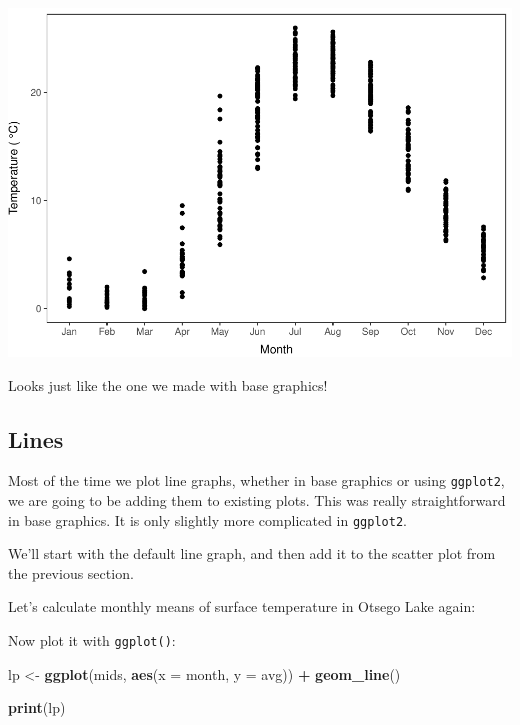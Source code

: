 \documentclass[
]{book}
\newenvironment{Shaded}{\begin{snugshade}}{\end{snugshade}}
\newcommand{\DataTypeTok}[1]{\textcolor[rgb]{0.13,0.29,0.53}{#1}}
\newcommand{\KeywordTok}[1]{\textcolor[rgb]{0.13,0.29,0.53}{\textbf{#1}}}
\newcommand{\NormalTok}[1]{#1}
\newcommand{\OperatorTok}[1]{\textcolor[rgb]{0.81,0.36,0.00}{\textbf{#1}}}
\newcommand{\StringTok}[1]{\textcolor[rgb]{0.31,0.60,0.02}{#1}}
\begin{document}
\includegraphics{worstr_files/figure-latex/unnamed-chunk-107-1.pdf}

Looks just like the one we made with base graphics!

\hypertarget{gglines}{%
\subsection{Lines}\label{gglines}}

Most of the time we plot line graphs, whether in base graphics or using \texttt{ggplot2}, we are going to be adding them to existing plots. This was really straightforward in base graphics. It is only slightly more complicated in \texttt{ggplot2}.

We'll start with the default line graph, and then add it to the scatter plot from the previous section.

Let's calculate monthly means of surface temperature in Otsego Lake again:

\begin{Shaded}
\end{Shaded}

Now plot it with \texttt{ggplot()}:

\begin{Shaded}
\begin{Highlighting}[]
\NormalTok{lp <-}\StringTok{ }\KeywordTok{ggplot}\NormalTok{(mids, }\KeywordTok{aes}\NormalTok{(}\DataTypeTok{x =}\NormalTok{ month, }\DataTypeTok{y =}\NormalTok{ avg)) }\OperatorTok{+}
\StringTok{  }\KeywordTok{geom_line}\NormalTok{()}

\KeywordTok{print}\NormalTok{(lp)}
\end{Highlighting}
\end{Shaded}
\end{document}
